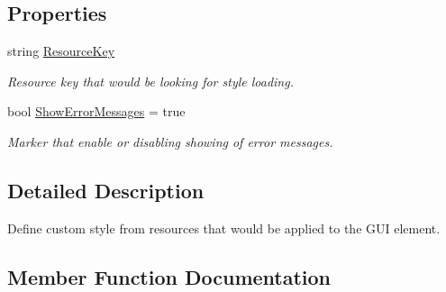 \subsection*{Properties}
\begin{DoxyCompactItemize}
\item 
string \mbox{\hyperlink{class_wpf_handler_1_1_u_i_1_1_auto_layout_1_1_options_1_1_style_attribute_a25d5446eb9674e30cf46c642734648fa}{Resource\+Key}}
\begin{DoxyCompactList}\small\item\em Resource key that would be looking for style loading. \end{DoxyCompactList}\item 
bool \mbox{\hyperlink{class_wpf_handler_1_1_u_i_1_1_auto_layout_1_1_options_1_1_style_attribute_a86e104f756eca13578f07d3c04832a7a}{Show\+Error\+Messages}} = true
\begin{DoxyCompactList}\small\item\em Marker that enable or disabling showing of error messages. \end{DoxyCompactList}\end{DoxyCompactItemize}


\subsection{Detailed Description}
Define custom style from resources that would be applied to the G\+UI element. 



\subsection{Member Function Documentation}
\mbox{\label{class_wpf_handler_1_1_u_i_1_1_auto_layout_1_1_options_1_1_style_attribute_a4507ba7b9729b527b0c4f57bffaac0be}} 
